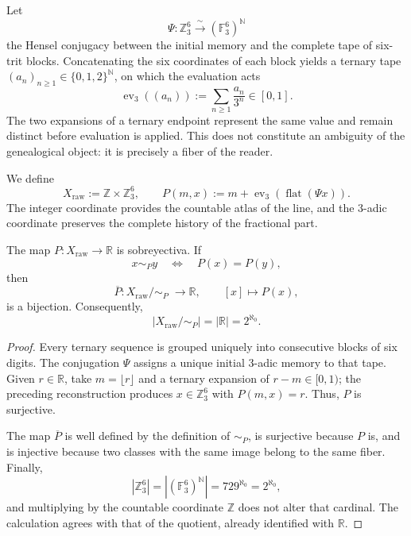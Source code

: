 Let
\[
 \Psi:\mathbb Z_3^6\xrightarrow{\ \sim\ }
       (\mathbb F_3^6)^{\mathbb N}
\]
the Hensel conjugacy between the initial memory and the complete tape of
six-trit blocks. Concatenating the six coordinates of each block yields
a ternary tape
\(
 (a_n)_{n\geq 1}\in\{0,1,2\}^{\mathbb N}
\), on which the evaluation acts
\[
 \operatorname{ev}_3((a_n))
 :=\sum_{n\geq1}\frac{a_n}{3^n}\in[0,1].
\]
The two expansions of a ternary endpoint represent the same value and
remain distinct before evaluation is applied. This does not constitute
an ambiguity of the genealogical object: it is precisely a fiber of the reader.

We define
\[
 X_{\mathrm{raw}}:=\mathbb Z\times\mathbb Z_3^6,
 \qquad
 P(m,x):=m+\operatorname{ev}_3(\operatorname{flat}(\Psi x)).
\]
The integer coordinate provides the countable atlas of the line, and the
3-adic coordinate preserves the complete history of the fractional part.

\begin{theorem}
\label{p12-83-c18-s2:hmtch:thm-cociente-real}
The map \(P:X_{\mathrm{raw}}\to\mathbb R\) is sobreyectiva. If
\[
 x\sim_P y
 \quad\Longleftrightarrow\quad
 P(x)=P(y),
\]
then
\[
 \overline P:X_{\mathrm{raw}}/\!\sim_P\;\longrightarrow\mathbb R,
 \qquad [x]\longmapsto P(x),
\]
is a bijection. Consequently,
\[
 \left|X_{\mathrm{raw}}/\!\sim_P\right|
 =|\mathbb R|
 =2^{\aleph_0}.
\]
\end{theorem}

\begin{proof}
Every ternary sequence is grouped uniquely into consecutive blocks of
six digits. The conjugation \(\Psi\) assigns a unique initial
3-adic memory to that tape. Given \(r\in\mathbb R\), take
\(m=\lfloor r\rfloor\) and a ternary expansion of
\(r-m\in[0,1)\); the preceding reconstruction produces
\(x\in\mathbb Z_3^6\) with \(P(m,x)=r\). Thus, \(P\) is surjective.

The map \(\overline P\) is well defined by the definition of
\(\sim_P\), is surjective because \(P\) is, and is injective because two
classes with the same image belong to the same fiber. Finally,
\[
 |\mathbb Z_3^6|
 =\left|(\mathbb F_3^6)^{\mathbb N}\right|
 =729^{\aleph_0}
 =2^{\aleph_0},
\]
and multiplying by the countable coordinate \(\mathbb Z\) does not alter that
cardinal. The calculation agrees with that of the quotient, already identified with
\(\mathbb R\).
\end{proof}


